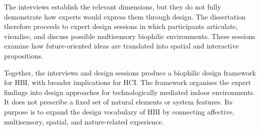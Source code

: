 The interviews establish the relevant dimensions, but they do not fully demonstrate how experts would express them through design. The dissertation therefore proceeds to expert design sessions in which participants articulate, visualise, and discuss possible multisensory biophilic environments. These sessions examine how future-oriented ideas are translated into spatial and interactive propositions.

Together, the interviews and design sessions produce a biophilic design framework for HBI, with broader implications for HCI. The framework organises the expert findings into design approaches for technologically mediated indoor environments. It does not prescribe a fixed set of natural elements or system features. Its purpose is to expand the design vocabulary of HBI by connecting affective, multisensory, spatial, and nature-related experience.
